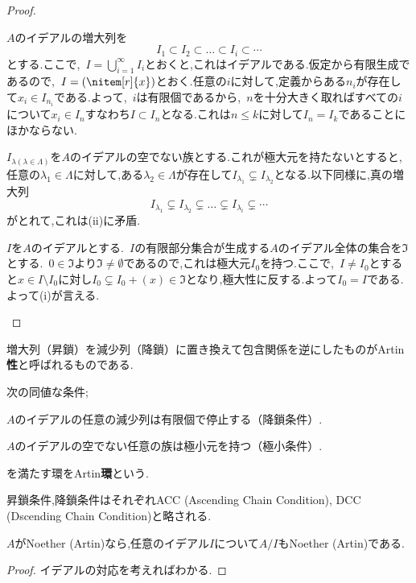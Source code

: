 \begin{proof}
	\begin{eqv}[3]
		\item 
		$A$のイデアルの増大列を
		\[I_1\subset I_2\subset\dots\subset I_i\subset\cdots\]
		とする.ここで,~$I=\bigcup_{i=1}^\infty I_i$とおくと,これはイデアルである.仮定から有限生成であるので,~$I=(\nitem[r]{x})$とおく.任意の$i$に対して,定義からある$n_i$が存在して$x_i\in I_{n_i}$である.よって,~$i$は有限個であるから,~$n$を十分大きく取ればすべての$i$について$x_i\in I_n$すなわち$I\subset I_{n}$となる.これは$n\leq k$に対して$I_{n}=I_k$であることにほかならない.
		\item
		$I_{\lambda(\lambda\in\Lambda)}$を$A$のイデアルの空でない族とする.これが極大元を持たないとすると,任意の$\lambda_1\in\Lambda$に対して,ある$\lambda_2\in\Lambda$が存在して$I_{\lambda_1}\subsetneq I_{\lambda_2}$となる.以下同様に,真の増大列
		\[I_{\lambda_1}\subsetneq I_{\lambda_2}\subsetneq\dots\subsetneq I_{\lambda_i}\subsetneq\cdots\]
		がとれて,これは(ii)に矛盾.
		\item 
		$I$を$A$のイデアルとする.~$I$の有限部分集合が生成する$A$のイデアル全体の集合を$\Im$とする.~$0\in\Im$より$\Im\neq\emptyset$であるので,これは極大元$I_0$を持つ.ここで,~$I\neq I_0$とすると$x\in I\setminus I_0$に対し$I_0\subsetneq I_0+(x)\in\Im$となり,極大性に反する.よって$I_0=I$である.よって(i)が言える.
	\end{eqv}
\end{proof}

増大列（昇鎖）を減少列（降鎖）に置き換えて包含関係を逆にしたものがArtin\textbf{性}と呼ばれるものである.

\begin{defi}[Artin環]
	次の同値な条件;
	\begin{sakura}
		\item  $A$のイデアルの任意の減少列は有限個で停止する（降鎖条件）.
		\item $A$のイデアルの空でない任意の族は極小元を持つ（極小条件）.
	\end{sakura}
	を満たす環をArtin\textbf{環}という.
\end{defi}

昇鎖条件,降鎖条件はそれぞれACC (Ascending Chain Condition), DCC (Dscending Chain Condition)と略される.

\begin{prop}
	$A$がNoether (Artin)なら,任意のイデアル$I$について$A/I$もNoether (Artin)である.
\end{prop}
\begin{proof}
	イデアルの対応を考えればわかる.
\end{proof}


